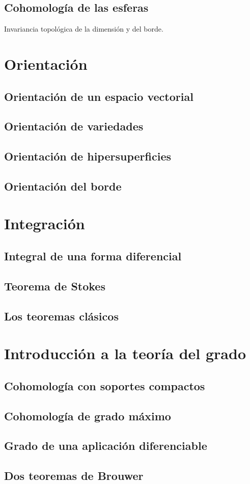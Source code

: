 \documentclass[12pt,a4paper]{book}
\theoremstyle{definition} \newtheorem{defn}[thm]{Definición}
\theoremstyle{definition} \newtheorem{ejemplo}[thm]{Ejemplo}
\theoremstyle{definition} \newtheorem{ejercicio}[thm]{Ejercicio}
\theoremstyle{remark} \newtheorem*{obs}{Observación}
\begin{document}
	  \section{Cohomología de las esferas}
	  Invariancia topológica de la dimensión y del borde.
	  \chapter{Orientación}
	  \section{Orientación de un espacio vectorial}
	  \section{Orientación de variedades}
	  \section{Orientación de hipersuperficies}
	  \section{Orientación del borde}
	  \chapter{Integración}
	  \section{Integral de una forma diferencial}
	  \section{Teorema de Stokes}
	  \section{Los teoremas clásicos}
	  \chapter{Introducción a la teoría del grado}
	  \section{Cohomología con soportes compactos}
	  \section{Cohomología de grado máximo}
	  \section{Grado de una aplicación diferenciable}
	  \section{Dos teoremas de Brouwer}

		      
\end{document}
